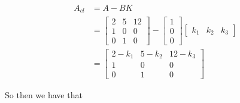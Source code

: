 \documentclass[main.tex]{subfiles}
\begin{document}
\begin{enumerate}
\begin{enumerate}
        $$
        \begin{aligned}            
        A_{c l}&=A-B K\\
        &=\left[\begin{array}{ccc}
        2 & 5 & 12 \\
        1 & 0 & 0 \\
        0 & 1 & 0
        \end{array}\right]-\left[\begin{array}{l}
        1 \\
        0 \\
        0
        \end{array}\right]\left[\begin{array}{lll}
        k_1 & k_2 & k_3
        \end{array}\right]\\
        &=\left[\begin{array}{ccc}
        2-k_1 & 5-k_2 & 12-k_3 \\
        1 & 0 & 0 \\
        0 & 1 & 0
        \end{array}\right]
        \end{aligned}
        $$

        So then we have that
        

\end{enumerate}
\end{enumerate}
\end{document}

